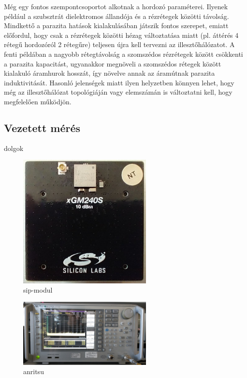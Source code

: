 \documentclass[a4paper,12pt,titlepage]{article}
\begin{document}
        \par
        Még egy fontos szempontcsoportot alkotnak a hordozó paraméterei. Ilyenek például a szubsztrát dielektromos állandója és a rézrétegek közötti távolság. Mindkettő a parazita hatások kialakulásában játszik fontos szerepet, emiatt előfordul, hogy csak a rézrétegek közötti hézag változtatása miatt (pl. áttérés 4 rétegű hordozóról 2 rétegűre) teljesen újra kell tervezni az illesztőhálózatot. A fenti példában a nagyobb rétegtávolság a szomszédos rézrétegek között csökkenti a parazita kapacitást, ugyanakkor megnöveli a szomszédos rétegek között kialakuló áramhurok hosszát, így növelve annak az áramútnak parazita induktivitását. Hasonló jelenségek miatt ilyen helyzetben könnyen lehet, hogy még az illesztőhálózat topológiáján vagy elemszámán is változtatni kell, hogy megfelelően működjön.
        \subsection{Vezetett mérés}
            dolgok
            \begin{figure}
                \centering
                \includegraphics[width=0.6\textwidth]{kep/szerkesztett/sip-modul.jpg}
                \caption{sip-modul}
                \label{fig:sip}
            \end{figure}

            \begin{figure}
                \centering
                \includegraphics[width=0.6\textwidth]{kep/szerkesztett/anritsu.jpg}
                \caption{anritsu}
                \label{fig:anritsu}
            \end{figure}
\end{document}

